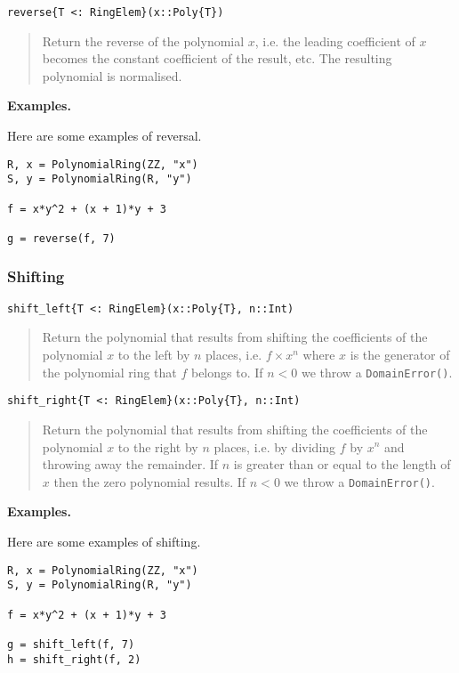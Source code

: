 \documentclass[a4paper,10pt]{article}
\newcommand{\code}{\lstinline}
\newcommand{\desc}[1]{\vspace{-3mm}\begin{quote}#1\end{quote}}
\begin{document}
\begin{lstlisting}
reverse{T <: RingElem}(x::Poly{T})
\end{lstlisting}

\desc{Return the reverse of the polynomial $x$, i.e. the leading coefficient
of $x$ becomes the constant coefficient of the result, etc. The resulting
polynomial is normalised.}

\textbf{Examples.}

Here are some examples of reversal.

\begin{lstlisting}
R, x = PolynomialRing(ZZ, "x")
S, y = PolynomialRing(R, "y")

f = x*y^2 + (x + 1)*y + 3

g = reverse(f, 7)
\end{lstlisting}

\subsubsection{Shifting}

\begin{lstlisting}
shift_left{T <: RingElem}(x::Poly{T}, n::Int)
\end{lstlisting}

\desc{Return the polynomial that results from shifting the coefficients of the
polynomial $x$ to the left by $n$ places, i.e. $f\times x^n$ where $x$ is the
generator of the polynomial ring that $f$ belongs to. If $n < 0$ we throw a
\code{DomainError()}.}

\begin{lstlisting}
shift_right{T <: RingElem}(x::Poly{T}, n::Int)
\end{lstlisting}

\desc{Return the polynomial that results from shifting the coefficients of the
polynomial $x$ to the right by $n$ places, i.e. by dividing $f$ by $x^n$ and
throwing away the remainder. If $n$ is greater than or equal to the length of
$x$ then the zero polynomial results. If $n < 0$ we throw a 
\code{DomainError()}.}

\textbf{Examples.}

Here are some examples of shifting.

\begin{lstlisting}
R, x = PolynomialRing(ZZ, "x")
S, y = PolynomialRing(R, "y")

f = x*y^2 + (x + 1)*y + 3

g = shift_left(f, 7)
h = shift_right(f, 2)
\end{lstlisting}
\end{document}
